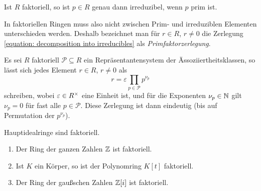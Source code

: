 \begin{lemma}
  Ist $R$ faktoriell, so ist $p \in R$ genau dann irreduzibel, wenn $p$ prim ist.
\end{lemma}

In faktoriellen Ringen muss also nicht zwischen Prim- und irreduziblen Elementen unterschieden werden.
Deshalb bezeichnet man für $r \in R$, $r \neq 0$ die Zerlegung \eqref{equation: decomposition into irreducibles} als \emph{Primfaktorzerlegung}.

\begin{remark}
  Es sei $R$ faktoriell $\mathcal{P} \subseteq R$ ein Repräsentantensystem der Ässoziiertheitsklassen, so lässt sich jedes Element $r \in R$, $r \neq 0$ als
  \[
    r = \varepsilon \prod_{p \in \mathcal{P}} p^{\nu_p}
  \]
  schreiben, wobei $\varepsilon \in R^{\times}$ eine Einheit ist, und für die Exponenten $\nu_p \in \mathbb{N}$ gilt $\nu_p = 0$ für fast alle $p \in \mathcal{P}$.
  Diese Zerlegung ist dann eindeutig (bis auf Permutation der $p^{\nu_p}$).
\end{remark}


\begin{proposition}
  Hauptidealringe sind faktoriell.
\end{proposition}

\begin{example}
  \begin{enumerate}
    \item
      Der Ring der ganzen Zahlen $\mathbb{Z}$ ist faktoriell.
    \item
      Ist $K$ ein Körper, so ist der Polynomring $K[t]$ faktoriell.
    \item
      Der Ring der gaußschen Zahlen $\mathbb{Z}[i]$ ist faktoriell.
  \end{enumerate}
\end{example}

